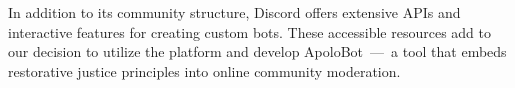 In addition to its community structure, Discord offers extensive APIs and interactive features for creating custom bots. These accessible resources add to our decision to utilize the platform and develop ApoloBot~---~a tool that embeds restorative justice principles into online community moderation. %


\begin{comment}
\subsection{Design Objectives}
Our research builds upon Xiao et al.’s case study examining the early opportunities and challenges for using restorative justice to address online interpersonal harm, also taking Discord as part of the research settings \cite{Xiao2023}. While the work focuses on a manual approach involving victim-offender conferences mediated by a facilitator, we take this further in a more technical approach. Utilizing ApoloBot as a tool dedicated to streamline the restoration process, we tackle the challenge of resource limitations highlighted in the study, thereby exploring additional factors for its effective implementation. We also draw from the challenges and implications of their work to shape our system’s design goals, using it as a primary reference alongside other related studies that inform our approach.

One of the significant challenges in implementing restorative justice is managing the conflicting interests among and within the involved stakeholders. As seen in Xiao et al.’s work, while several victims were open restorative approaches to address their needs and facilitate healing, concerns were raised regarding offenders’ readiness or whether restorative justice can fully resolve issues, particularly when deeper-rooted problems were involved. Offenders showed very little interest in the restorative process, as their attitude remain oriented toward avoiding punishment rather than acknowledging their wrongdoing and genuinely apologize. Our system should allow spaces for stakeholders to engage in meaningful conversations to the fullest extent possible without compelling their participation, which could lead to negative outcomes. 
\begin{quote}
\indent \textit{\textbf{Design Goal 1 (G1):} ApoloBot should be flexible, being able to accommodate the diverse needs and willingness of involved stakeholders.}
\end{quote}


\end{comment}
